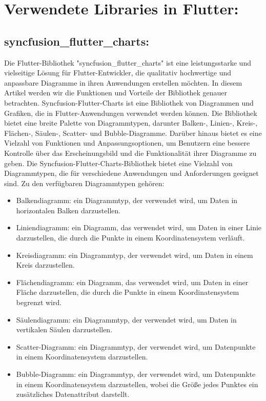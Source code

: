 \section{Verwendete Libraries in Flutter:}
\subsection*{syncfusion\_flutter\_charts:}

Die Flutter-Bibliothek "syncfusion\_flutter\_charts" ist eine leistungsstarke und vielseitige Lösung für Flutter-Entwickler, die qualitativ hochwertige und anpassbare Diagramme in ihren Anwendungen erstellen möchten. 
In diesem Artikel werden wir die Funktionen und Vorteile der Bibliothek genauer betrachten. 
Syncfusion-Flutter-Charts ist eine Bibliothek von Diagrammen und Grafiken, die in Flutter-Anwendungen verwendet werden können. Die Bibliothek bietet eine breite Palette von Diagrammtypen, darunter Balken-, Linien-, Kreis-, Flächen-, Säulen-, Scatter- und Bubble-Diagramme. 
Darüber hinaus bietet es eine Vielzahl von Funktionen und Anpassungsoptionen, um Benutzern eine bessere Kontrolle über das Erscheinungsbild und die Funktionalität ihrer Diagramme zu geben.
Die Syncfusion-Flutter-Charts-Bibliothek bietet eine Vielzahl von Diagrammtypen, die für verschiedene Anwendungen und Anforderungen geeignet sind. Zu den verfügbaren Diagrammtypen gehören:
\begin{itemize}
    \item Balkendiagramm: ein Diagrammtyp, der verwendet wird, um Daten in horizontalen Balken darzustellen.
    \item Liniendiagramm: ein Diagramm, das verwendet wird, um Daten in einer Linie darzustellen, die durch die Punkte in einem Koordinatensystem verläuft.
    \item Kreisdiagramm: ein Diagrammtyp, der verwendet wird, um Daten in einem Kreis darzustellen.
    \item Flächendiagramm: ein Diagramm, das verwendet wird, um Daten in einer Fläche darzustellen, die durch die Punkte in einem Koordinatensystem begrenzt wird.
    \item Säulendiagramm: ein Diagrammtyp, der verwendet wird, um Daten in vertikalen Säulen darzustellen.
    \item Scatter-Diagramm: ein Diagrammtyp, der verwendet wird, um Datenpunkte in einem Koordinatensystem darzustellen.
    \item Bubble-Diagramm: ein Diagrammtyp, der verwendet wird, um Datenpunkte in einem Koordinatensystem darzustellen, wobei die Größe jedes Punktes ein zusätzliches Datenattribut darstellt.
\end{itemize}
